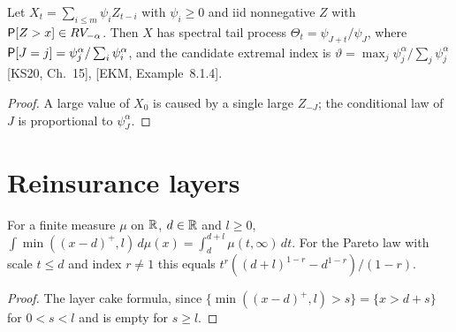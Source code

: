 \begin{theorem}
  \label{thm:moving-average-tail-process}
  \leanok
  Let $X_t = \sum_{i \le m} \psi_i Z_{t-i}$ with $\psi_i \ge 0$ and iid nonnegative $Z$ with
  $\mathsf{P}[Z > x] \in RV_{-\alpha}$. Then $X$ has spectral tail process $\Theta_t = \psi_{J+t}/\psi_J$, where
  $\mathsf{P}[J = j] = \psi_j^\alpha / \sum_i \psi_i^\alpha$, and the candidate extremal index is
  $\vartheta = \max_j \psi_j^\alpha / \sum_j \psi_j^\alpha$ [KS20, Ch.~15], [EKM, Example~8.1.4].
\end{theorem}
\begin{proof}
  \leanok
  A large value of $X_0$ is caused by a single large $Z_{-J}$; the conditional law of $J$ is proportional
  to $\psi_J^\alpha$.
\end{proof}

\section{Reinsurance layers}

\begin{proposition}
  \label{prop:layer-payout}
  \leanok
  For a finite measure $\mu$ on $\mathbb{R}$, $d \in \mathbb{R}$ and $l \ge 0$,
  $\int \min((x - d)^+, l) \, d\mu(x) = \int_d^{d + l} \mu(t, \infty) \, dt$. For the Pareto law with
  scale $t \le d$ and index $r \ne 1$ this equals $t^r ((d + l)^{1 - r} - d^{1 - r}) / (1 - r)$.
\end{proposition}
\begin{proof}
  \leanok
  The layer cake formula, since $\{\min((x - d)^+, l) > s\} = \{x > d + s\}$ for $0 < s < l$ and is empty
  for $s \ge l$.
\end{proof}
